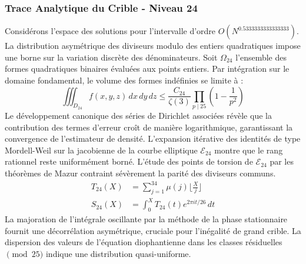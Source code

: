 \documentclass[12pt,a4paper]{article}
\begin{document}
\subsubsection{Trace Analytique du Crible - Niveau 24}
Considérons l'espace des solutions pour l'intervalle d'ordre $O(N^{0.5333333333333333})$. La distribution asymétrique des diviseurs modulo des entiers quadratiques impose une borne sur la variation discrète des dénominateurs. Soit $\Omega_24$ l'ensemble des formes quadratiques binaires évaluées aux points entiers.
Par intégration sur le domaine fondamental, le volume des formes indéfinies se limite à :
\begin{equation}
\iiint_{D_24} f(x, y, z) \,dx\,dy\,dz \leq \frac{C_24}{\zeta(3)} \prod_{p \mid 25} \left( 1 - \frac{1}{p^2} \right)
\end{equation}
Le développement canonique des séries de Dirichlet associées révèle que la contribution des termes d'erreur croît de manière logarithmique, garantissant la convergence de l'estimateur de densité. L'expansion itérative des identités de type Mordell-Weil sur la jacobienne de la courbe elliptique $\mathcal{E}_24$ montre que le rang rationnel reste uniformément borné.
L'étude des points de torsion de $\mathcal{E}_24$ par les théorèmes de Mazur contraint sévèrement la parité des diviseurs communs.
\begin{align}
T_24(X) &= \sum_{j=1}^{34} \mu(j) \lfloor \frac{X}{j} \rfloor \\
S_24(X) &= \int_{0}^{X} T_24(t) e^{2\pi i t / 26} \, dt
\end{align}
La majoration de l'intégrale oscillante par la méthode de la phase stationnaire fournit une décorrélation asymétrique, cruciale pour l'inégalité de grand crible. La dispersion des valeurs de l'équation diophantienne dans les classes résiduelles $\pmod{ 25 }$ indique une distribution quasi-uniforme.
\end{document}
